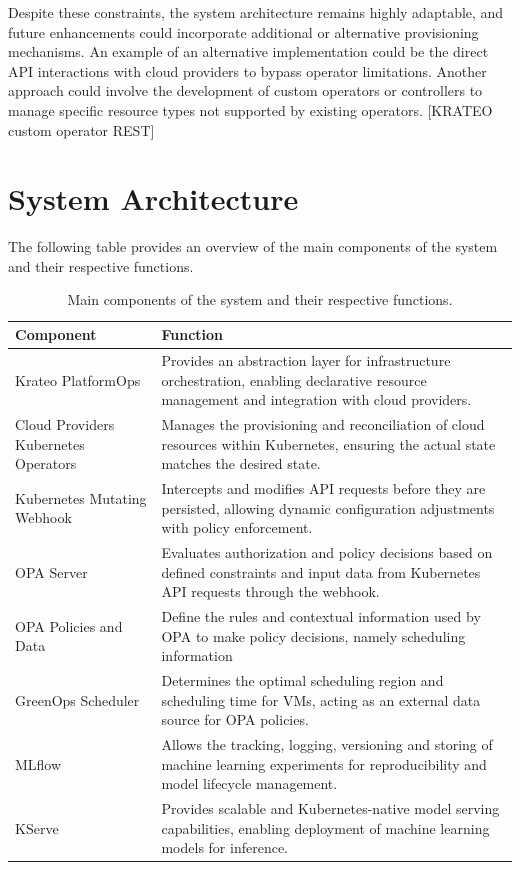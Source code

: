 Despite these constraints, the system architecture remains highly adaptable, and future enhancements could incorporate additional or alternative provisioning mechanisms. 
An example of an alternative implementation could be the direct API interactions with cloud providers to bypass operator limitations. Another approach could involve the development of custom operators or controllers to manage specific resource types not supported by existing operators. 
[KRATEO custom operator REST]

\newpage
\section{System Architecture}
\label{sec:system_architecture}

The following table provides an overview of the main components of the system and their respective functions.

\begin{table}[H]
  \centering
  \renewcommand{\arraystretch}{1.3} %
  \begin{tabularx}{\textwidth}{| l | X |} %
    \hline
    \textbf{Component} & \textbf{Function} \\
    \hline
    Krateo PlatformOps & Provides an abstraction layer for infrastructure orchestration, enabling declarative resource management and integration with cloud providers. \\
    \hline
    Cloud Providers Kubernetes Operators & Manages the provisioning and reconciliation of cloud resources within Kubernetes, ensuring the actual state matches the desired state. \\
    \hline
    Kubernetes Mutating Webhook & Intercepts and modifies API requests before they are persisted, allowing dynamic configuration adjustments with policy enforcement. \\
    \hline
    OPA Server & Evaluates authorization and policy decisions based on defined constraints and input data from Kubernetes API requests through the webhook. \\
    \hline
    OPA Policies and Data & Define the rules and contextual information used by OPA to make policy decisions, namely scheduling information \\
    \hline
    GreenOps Scheduler & Determines the optimal scheduling region and scheduling time for VMs, acting as an external data source for OPA policies. \\
    \hline
    MLflow & Allows the tracking, logging, versioning and storing of machine learning experiments for reproducibility and model lifecycle management. \\
    \hline
    KServe & Provides scalable and Kubernetes-native model serving capabilities, enabling deployment of machine learning models for inference. \\
    \hline
  \end{tabularx}
  \caption{Main components of the system and their respective functions.}
  \label{tab:system_components}
\end{table}




